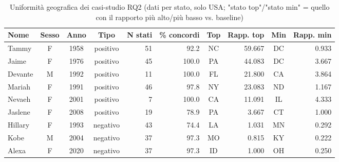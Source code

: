 \begin{table}[t]
\centering
\scriptsize
\caption{Uniformità geografica dei casi-studio RQ2 (dati per stato, solo USA; "stato top"/"stato min" = quello con il rapporto più alto/più basso vs. baseline)}
\label{tab:state_concentration}
\begin{tabular}{l c c c r r c r c r}
\toprule
\textbf{Nome} & \textbf{Sesso} & \textbf{Anno} & \textbf{Tipo} & \textbf{N stati} & \textbf{\% concordi} & \textbf{Top} & \textbf{Rapp. top} & \textbf{Min} & \textbf{Rapp. min} \\
\midrule
Tammy & F & 1958 & positivo & 51 & 92.2 & NC & 59.667 & DC & 0.933 \\
Jaime & F & 1976 & positivo & 45 & 100.0 & PA & 44.083 & DC & 3.667 \\
Devante & M & 1992 & positivo & 11 & 100.0 & FL & 21.800 & CA & 3.864 \\
Mariah & F & 1991 & positivo & 46 & 97.8 & NY & 23.083 & ND & 1.167 \\
Nevaeh & F & 2001 & positivo & 7 & 100.0 & CA & 11.091 & IL & 4.333 \\
Jaslene & F & 2008 & positivo & 19 & 78.9 & PA & 3.667 & CT & 1.000 \\
Hillary & F & 1993 & negativo & 43 & 74.4 & LA & 1.031 & MN & 0.292 \\
Kobe & M & 2004 & negativo & 37 & 97.3 & MO & 0.815 & KY & 0.222 \\
Alexa & F & 2020 & negativo & 37 & 97.3 & ID & 1.000 & OH & 0.250 \\
\bottomrule
\end{tabular}
\end{table}
